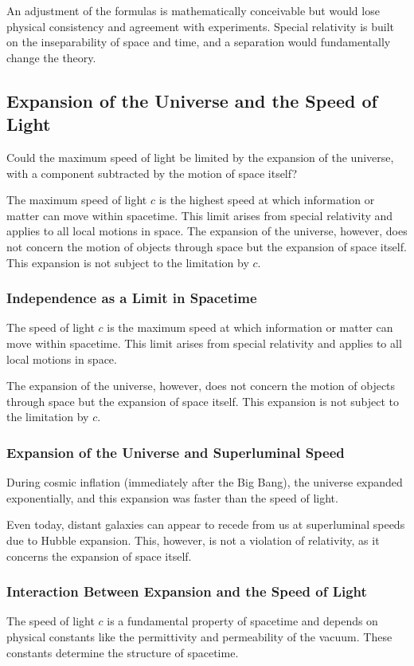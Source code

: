 \documentclass[a4paper,12pt]{article}
\begin{document}
	An adjustment of the formulas is mathematically conceivable but would lose physical consistency and agreement with experiments. Special relativity is built on the inseparability of space and time, and a separation would fundamentally change the theory.
	
	\subsection{Expansion of the Universe and the Speed of Light}
	Could the maximum speed of light be limited by the expansion of the universe, with a component subtracted by the motion of space itself?
	
	The maximum speed of light \( c \) is the highest speed at which information or matter can move within spacetime. This limit arises from special relativity and applies to all local motions in space. The expansion of the universe, however, does not concern the motion of objects through space but the expansion of space itself. This expansion is not subject to the limitation by \( c \).
	
	\subsubsection{Independence as a Limit in Spacetime}
	The speed of light \( c \) is the maximum speed at which information or matter can move within spacetime. This limit arises from special relativity and applies to all local motions in space.
	
	The expansion of the universe, however, does not concern the motion of objects through space but the expansion of space itself. This expansion is not subject to the limitation by \( c \).
	
	\subsubsection{Expansion of the Universe and Superluminal Speed}
	During cosmic inflation (immediately after the Big Bang), the universe expanded exponentially, and this expansion was faster than the speed of light.
	
	Even today, distant galaxies can appear to recede from us at superluminal speeds due to Hubble expansion. This, however, is not a violation of relativity, as it concerns the expansion of space itself.
	
	\subsubsection{Interaction Between Expansion and the Speed of Light}
	The speed of light \( c \) is a fundamental property of spacetime and depends on physical constants like the permittivity and permeability of the vacuum. These constants determine the structure of spacetime.
	
\end{document}
